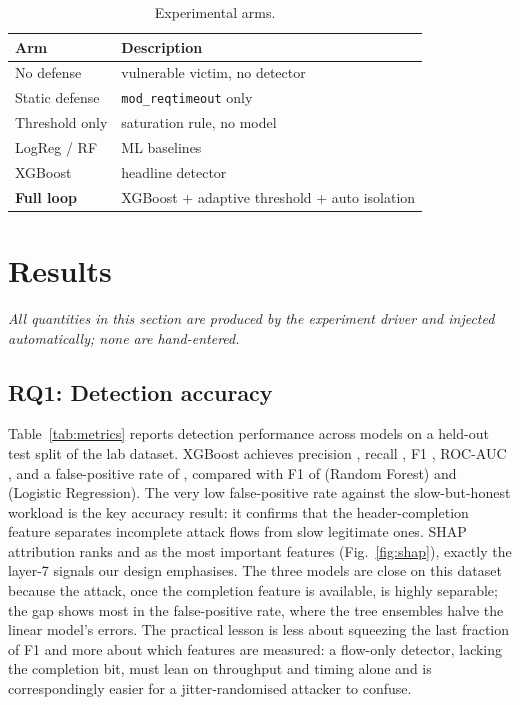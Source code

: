 \documentclass[conference]{IEEEtran}
\begin{document}
\begin{table}[t]
\caption{Experimental arms.}
\label{tab:arms}
\centering
\footnotesize
\begin{tabular}{@{}ll@{}}
\toprule
Arm & Description \\
\midrule
No defense        & vulnerable victim, no detector \\
Static defense    & \texttt{mod\_reqtimeout} only~\cite{apache_mpm} \\
Threshold only    & saturation rule, no model \\
LogReg / RF       & ML baselines~\cite{breiman2001rf,pedregosa2011sklearn} \\
XGBoost           & headline detector~\cite{chen2016xgboost} \\
\textbf{Full loop} & XGBoost + adaptive threshold + auto isolation \\
\bottomrule
\end{tabular}
\end{table}

\section{Results}
\emph{All quantities in this section are produced by the experiment driver and
injected automatically; none are hand-entered.}

\subsection{RQ1: Detection accuracy}
\label{sec:rq1}
Table~\ref{tab:metrics} reports detection performance across models on a held-out
test split of the lab dataset. XGBoost achieves precision \RESxgbPrec{}, recall
\RESxgbRec{}, F1 \RESxgbFone{}, ROC-AUC \RESxgbAuc{}, and a false-positive rate of
\RESxgbFpr{}, compared with F1 of \RESrfFone{} (Random Forest) and \RESlrFone{}
(Logistic Regression). The very low false-positive rate against the
slow-but-honest workload is the key accuracy result: it confirms that the
header-completion feature separates incomplete attack flows from slow legitimate
ones. SHAP attribution ranks \REStopFeatureOne{} and \REStopFeatureTwo{} as the
most important features (Fig.~\ref{fig:shap}), exactly the layer-7 signals our
design emphasises. The three models are close on this dataset because the attack,
once the completion feature is available, is highly separable; the gap shows most in
the false-positive rate, where the tree ensembles halve the linear model's errors.
The practical lesson is less about squeezing the last fraction of F1 and more about
which features are measured: a flow-only detector, lacking the completion bit, must
lean on throughput and timing alone and is correspondingly easier for a
jitter-randomised attacker to confuse.
\end{document}

